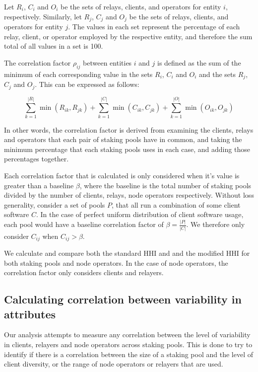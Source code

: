 \documentclass[conference]{IEEEtran}
\begin{document}
Let $R_i$, $C_i$ and $O_i$ be the sets of relays, clients, and operators for entity $i$, respectively. Similarly, let $R_j$, $C_j$ and $O_j$ be the sets of relays, clients, and operators for entity $j$.  The values in each set represent the percentage of each relay, client, or operator employed by the respective entity, and therefore the sum total of all values in a set is 100.

The correlation factor $\rho_{ij}$ between entities $i$ and $j$ is defined as the sum of the minimum of each corresponding value in the sets $R_i$, $C_i$ and $O_i$ and the sets $R_j$, $C_j$ and $O_j$. This can be expressed as follows:

\[
\sum_{k=1}^{|R|} \min(R_{ik}, R_{jk}) + \sum_{k=1}^{|C|} \min(C_{ik}, C_{jk}) + \sum_{k=1}^{|O|} \min(O_{ik}, O_{jk})
\]

In other words, the correlation factor is derived from examining the clients, relays and operators that each pair of staking pools have in common, and taking the minimum percentage that each staking pools uses in each case, and adding those percentages together.

Each correlation factor that is calculated is only considered when it's value is greater than a baseline $\beta$, where the baseline is the total number of staking pools divided by the number of clients, relays, node operators respectively.  Without loss generality, consider a set of pools $P$, that all run a combination of some client software $C$.  In the case of perfect uniform distribution of client software usage, each pool would have a baseline correlation factor of $\beta = \frac{|P|}{|C|}$.  We therefore only consider $C_{ij}$ when $C_{ij} > \beta$.

We calculate and compare both the standard HHI and and the modified HHI for both staking pools and node operators.  In the case of node operators, the correlation factor only considers clients and relayers.

\subsection{Calculating correlation between variability in attributes}

Our analysis attempts to measure any correlation between the level of variability in clients, relayers and node operators across staking pools. This is done to try to identify if there is a correlation between the size of a staking pool and the level of client diversity, or the range of node operators or relayers that are used.
\end{document}
